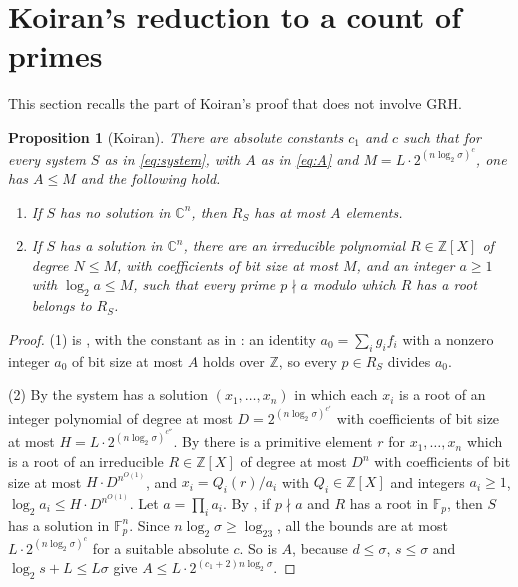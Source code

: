 \documentclass[11pt]{amsart}
\newtheorem{proposition}[thm]{Proposition}
\theoremstyle{definition}
\theoremstyle{remark}
\newcommand{\Z}{\mathbb Z}
\newcommand{\C}{\mathbb C}
\newcommand{\F}{\mathbb F}
\begin{document}
\section{Koiran's reduction to a count of primes}\label{sec:koiran}
This section recalls the part of Koiran's proof that does not involve GRH.

\begin{proposition}[Koiran]\label{prop:koiran}
There are absolute constants $c_1$ and $c$ such that for every system $S$ as in \eqref{eq:system}, with $A$ as in \eqref{eq:A} and $M=L\cdot2^{(n\log_2\sigma)^c}$, one has $A\le M$ and the following hold.
\begin{enumerate}
\item If $S$ has no solution in $\C^n$, then $R_S$ has at most $A$ elements.
\item If $S$ has a solution in $\C^n$, there are an irreducible polynomial $R\in\Z[X]$ of degree $N\le M$, with coefficients of bit size at most $M$, and an integer $a\ge1$ with $\log_2a\le M$, such that every prime $p\nmid a$ modulo which $R$ has a root belongs to $R_S$.
\end{enumerate}
\end{proposition}

\begin{proof}
(1) is \cite[Theorem~5, p.~279]{K96}, with the constant as in \cite[Theorem~1]{K96}: an identity $a_0=\sum_ig_if_i$ with a nonzero integer $a_0$ of bit size at most $A$ holds over $\Z$, so every $p\in R_S$ divides $a_0$.

(2) By \cite[Theorem~7, p.~280]{K96} the system has a solution $(x_1,\dots,x_n)$ in which each $x_i$ is a root of an integer polynomial of degree at most $D=2^{(n\log_2\sigma)^{c'}}$ with coefficients of bit size at most $H=L\cdot2^{(n\log_2\sigma)^{c''}}$. By \cite[Theorem~4, p.~278]{K96} there is a primitive element $r$ for $x_1,\dots,x_n$ which is a root of an irreducible $R\in\Z[X]$ of degree at most $D^n$ with coefficients of bit size at most $H\cdot D^{n^{O(1)}}$, and $x_i=Q_i(r)/a_i$ with $Q_i\in\Z[X]$ and integers $a_i\ge1$, $\log_2a_i\le H\cdot D^{n^{O(1)}}$. Let $a=\prod_ia_i$. By \cite[Lemma~3, p.~281]{K96}, if $p\nmid a$ and $R$ has a root in $\F_p$, then $S$ has a solution in $\F_p^n$. Since $n\log_2\sigma\ge\log_23$, all the bounds are at most $L\cdot2^{(n\log_2\sigma)^c}$ for a suitable absolute $c$. So is $A$, because $d\le\sigma$, $s\le\sigma$ and $\log_2s+L\le L\sigma$ give $A\le L\cdot2^{(c_1+2)n\log_2\sigma}$.
\end{proof}
\end{document}

